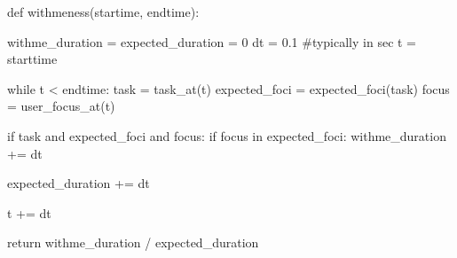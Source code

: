 \documentclass[compress]{beamer}
\begin{document}
\begin{frame}[fragile]{}
\begin{pythoncode}

def withmeness(startime, endtime):

    withme_duration = expected_duration = 0
    dt = 0.1 #typically in sec
    t = starttime

    while t < endtime:
        task = task_at(t)
        expected_foci = expected_foci(task)
        focus = user_focus_at(t)

        if task and expected_foci and focus:
            if focus in expected_foci:
                withme_duration += dt

            expected_duration += dt

        t += dt

    return withme_duration / expected_duration

\end{pythoncode}

\end{frame}
\end{document}

